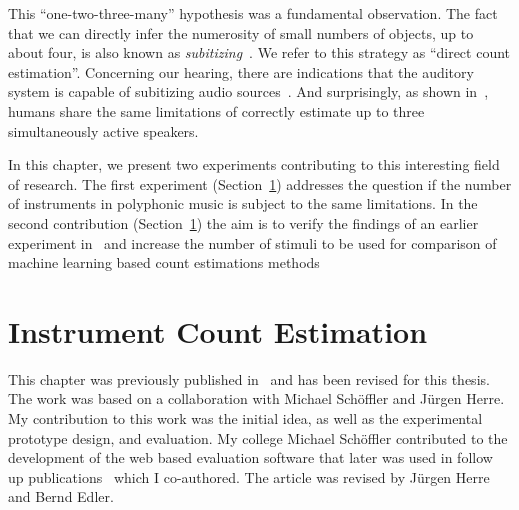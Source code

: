 This ``one-two-three-many'' hypothesis was a fundamental observation.
The fact that we can directly infer the numerosity of small numbers of objects, up to about four, is also known as \emph{subitizing}~\cite{kaufman49, burr10}. We refer to this strategy as ``direct count estimation''.
Concerning our hearing, there are indications that the auditory system is capable of subitizing audio sources~\cite{hoopen79}.
And surprisingly, as shown in~\cite{kashino96, kawashima15}, humans share the same limitations of correctly estimate up to three simultaneously active speakers.
\par
In this chapter, we present two experiments contributing to this interesting field of research.
The first experiment (Section~\ref{sec:ismir}) addresses the question if the number of instruments in polyphonic music is subject to the same limitations.
In the second contribution (Section~\ref{sec:ismir}) the aim is to verify the findings of an earlier experiment in~\cite{kawashima15} and increase the number of stimuli to be used for comparison of machine learning based count estimations methods

\section{Instrument Count Estimation}%
\label{sec:ismir}

\begin{shaded}
    This chapter was previously published in~\cite{stoeter13} and has been revised for this thesis.
    The work was based on a collaboration with Michael Schöffler and Jürgen Herre.
    My contribution to this work was the initial idea, as well as the experimental prototype design, and evaluation.
    My college Michael Schöffler contributed to the development of the web based evaluation software that later was used in follow up publications~\cite{schoeffler13, schoeffler18} which I co-authored. The article was revised by Jürgen Herre and Bernd Edler.
    \end{shaded}

